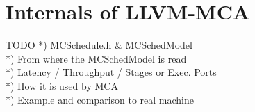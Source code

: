 
\section{Internals of LLVM-MCA}


\begin{frame}{TODO}
*) MCSchedule.h \& MCSchedModel\\
*) From where the MCSchedModel is read\\
*) Latency / Throughput / Stages or Exec. Ports \\
*) How it is used by MCA\\
*) Example and comparison to real machine\\
\end{frame}
